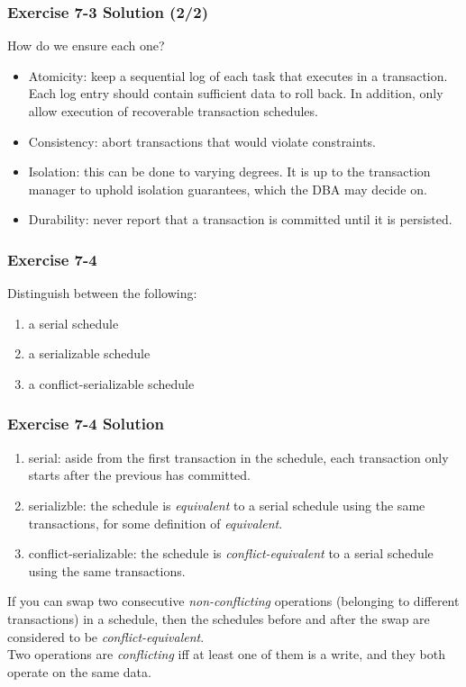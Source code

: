 \begin{frame}
\frametitle{Exercise 7-3 Solution (2/2)}

How do we ensure each one?

\begin{itemize}
  \item Atomicity: keep a sequential log of each task that executes in a transaction. Each log entry should contain sufficient data to roll back. In addition, only allow execution of recoverable transaction schedules.
  \item Consistency: abort transactions that would violate constraints.
  \item Isolation: this can be done to varying degrees. It is up to the transaction manager to uphold isolation guarantees, which the DBA may decide on.
  \item Durability: never report that a transaction is committed until it is persisted.
\end{itemize}

\end{frame}


\begin{frame}
\frametitle{Exercise 7-4}

Distinguish between the following:

\begin{enumerate}
  \item a serial schedule
  \item a serializable schedule
  \item a conflict-serializable schedule
\end{enumerate}

\end{frame}


\begin{frame}
\frametitle{Exercise 7-4 Solution}

\begin{enumerate}
  \item serial: aside from the first transaction in the schedule, each transaction only starts after the previous has committed.
  \item serializble: the schedule is \textit{equivalent} to a serial schedule using the same transactions, for some definition of \textit{equivalent}.
  \item conflict-serializable: the schedule is \textit{conflict-equivalent} to a serial schedule using the same transactions.
\end{enumerate}

If you can swap two consecutive \textit{non-conflicting} operations (belonging to different transactions) in a schedule, then the schedules before and after the swap are considered to be \textit{conflict-equivalent}. \\
Two operations are \textit{conflicting} iff at least one of them is a write, and they both operate on the same data.

\end{frame}


